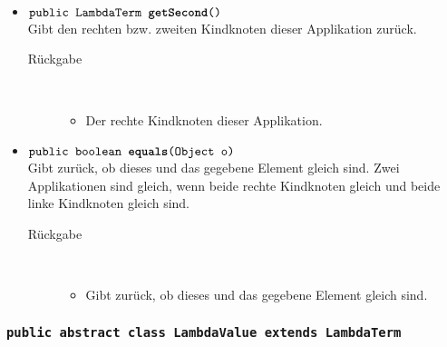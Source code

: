 \begin{description}
\begin{itemize}
		\item $\texttt{public LambdaTerm \textbf{getSecond}()}$ \\ Gibt den rechten bzw. zweiten Kindknoten dieser Applikation zurück.
		\begin{description}
			\item[Rückgabe] \hfill \\
			\vspace{-.8cm}
			\begin{itemize}
				\item  Der rechte Kindknoten dieser Applikation.
			\end{itemize}
		\end{description}
		
		\item $\texttt{public boolean \textbf{equals}(Object o)}$ \\ Gibt zurück, ob dieses und das gegebene Element gleich sind. Zwei Applikationen sind gleich, wenn beide rechte Kindknoten gleich und beide linke Kindknoten gleich sind.
		\begin{description}
			\item[Rückgabe] \hfill \\
			\vspace{-.8cm}
			\begin{itemize}
				\item Gibt zurück, ob dieses und das gegebene Element gleich sind.
			\end{itemize}
		\end{description}
	\end{itemize}
\end{description}

\subsubsection{\normalfont \texttt{public abstract class \textbf{LambdaValue} extends LambdaTerm}}

